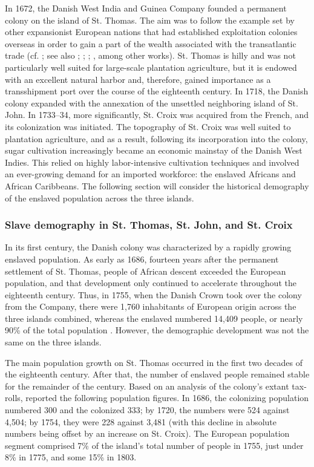 \documentclass[output=paper,colorlinks,citecolor=brown]{langscibook}
\begin{document}
In 1672, the Danish West India and Guinea Company founded a permanent colony on the island of St. Thomas. The aim was to follow the example set by other expansionist European nations that had established exploitation colonies overseas in order to gain a part of the wealth associated with the transatlantic trade (cf. \cite{JensenSimonsen_2016}; see also \cite{Hall_1992}; \cite{Gobel_2016}; \cite{Olsen_2017}; \cite{Robertsetal_2024}, among other works). St. Thomas is hilly and was not particularly well suited for large-scale plantation agriculture, but it is endowed with an excellent natural harbor and, therefore, gained importance as a transshipment port over the course of the eighteenth century. In 1718, the Danish colony expanded with the annexation of the unsettled neighboring island of St. John. In 1733–34, more significantly, St. Croix was acquired from the French, and its colonization was initiated. The topography of St. Croix was well suited to plantation agriculture, and as a result, following its incorporation into the colony, sugar cultivation increasingly became an economic mainstay of the Danish West Indies. This relied on highly labor-intensive cultivation techniques and involved an ever-growing demand for an imported workforce: the enslaved Africans and African Caribbeans. The following section will consider the historical demography of the enslaved population across the three islands.

\subsubsection{Slave demography in St. Thomas, St. John, and St. Croix}

In its first century, the Danish colony was characterized by a rapidly growing enslaved population. As early as 1686, fourteen years after the permanent settlement of St. Thomas, people of African descent exceeded the European population, and that development only continued to accelerate throughout the eighteenth century. Thus, in 1755, when the Danish Crown took over the colony from the Company, there were 1,760 inhabitants of European origin across the three islands combined, whereas the enslaved numbered 14,409 people, or nearly 90\% of the total population \citep[58]{Gobel_Sebro_2017}. However, the demographic development was not the same on the three islands.

The main population growth on St. Thomas occurred in the first two decades of the eighteenth century. After that, the number of enslaved people remained stable for the remainder of the century. Based on an analysis of the colony’s extant tax-rolls, \citet[157]{GreenPedersen_1971} reported the following population figures. In 1686, the colonizing population numbered 300 and the colonized 333; by 1720, the numbers were 524 against 4,504; by 1754, they were 228 against 3,481 (with this decline in absolute numbers being offset by an increase on St. Croix). The European population segment comprised 7\% of the island’s total number of people in 1755, just under 8\% in 1775, and some 15\% in 1803.
\end{document}
